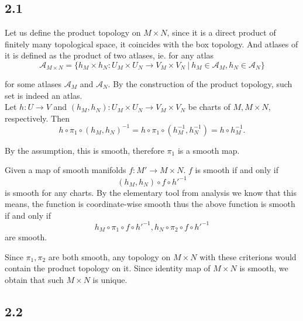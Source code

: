\documentclass{article}
\numberwithin{equation}{section}
\begin{document}
\subsection*{2.1}

Let us define the product topology on $M\times N$, since it is a direct product of finitely many topological space, it coincides with the box topology. And atlases of it is defined as the product of two atlases, ie. for any atlas 
\begin{equation*}
\mathcal{A}_{M\times N} = \{h_M\times h_N:U_M\times U_N\to V_M\times V_N\:|\: h_M\in\mathcal{A}_M,h_N\in\mathcal{A}_N\}
\end{equation*}

for some atlases $\mathcal{A}_M$ and $\mathcal{A}_N$. By the construction of the product topology, such set is indeed an atlas. \\

Let $h:U\to V$ and $(h_M,h_N):U_M\times U_N\to V_M\times V_N$ be charts of $M,M\times N$, respectively. Then
\begin{equation*}
h\circ \pi_1\circ (h_M,h_N)^{-1} = h\circ \pi_1\circ (h_M^{-1},h_N^{-1}) = h\circ h_M^{-1}.
\end{equation*}

By the assumption, this is smooth, therefore $\pi_1$ is a smooth map.\\

\par Given a map of smooth manifolds $f:M'\to M\times N$. $f$ is smooth if and only if 
\begin{equation*}
(h_M,h_N)\circ f\circ h'^{-1}
\end{equation*}
is smooth for any charts. By the elementary tool from analysis we know that this means, the function is coordinate-wise smooth thus the above function is smooth if and only if 
\begin{equation*}
h_M\circ\pi_1\circ f\circ h'^{-1},h_N\circ\pi_2\circ f\circ h'^{-1}
\end{equation*}
are smooth. \\

\par Since $\pi_1,\pi_2$ are both smooth, any topology on $M\times N$ with these criterions would contain the product topology on it. Since identity map of $M\times N$ is smooth, we obtain that such $M\times N$ is unique. 

\subsection*{2.2}
\end{document}
